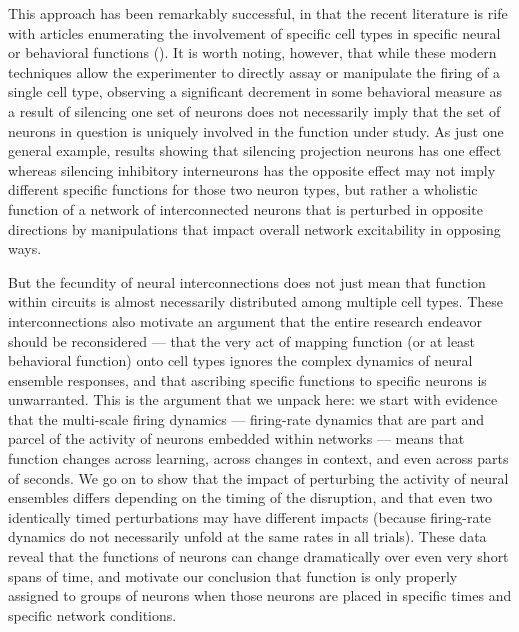 \begin{refsection}
This approach has been remarkably successful, in that the recent literature is rife with articles enumerating the involvement of specific cell types in specific neural or behavioral functions (\cite{adamantidis2015a,balthazart2020a,biselli2019a,janak2015a,tye2012a}). It is worth noting, however, that while these modern techniques allow the experimenter to directly assay or manipulate the firing of a single cell type, observing a significant decrement in some behavioral measure as a result of silencing one set of neurons does not necessarily imply that the set of neurons in question is uniquely involved in the function under study. As just one general example, results showing that silencing projection neurons has one effect whereas silencing inhibitory interneurons has the opposite effect may not imply different specific functions for those two neuron types, but rather a wholistic function of a network of interconnected neurons that is perturbed in opposite directions by manipulations that impact overall network excitability in opposing ways.

But the fecundity of neural interconnections does not just mean that function within circuits is almost necessarily distributed among multiple cell types. These interconnections also motivate an argument that the entire research endeavor should be reconsidered — that the very act of mapping function (or at least behavioral function) onto cell types ignores the complex dynamics of neural ensemble responses, and that ascribing specific functions to specific neurons is unwarranted. This is the argument that we unpack here: we start with evidence that the multi-scale firing dynamics — firing-rate dynamics that are part and parcel of the activity of neurons embedded within networks — means that function changes across learning, across changes in context, and even across parts of seconds. We go on to show that the impact of perturbing the activity of neural ensembles differs depending on the timing of the disruption, and that even two identically timed perturbations may have different impacts (because firing-rate dynamics do not necessarily unfold at the same rates in all trials). These data reveal that the functions of neurons can change dramatically over even very short spans of time, and motivate our conclusion that function is only properly assigned to groups of neurons when those neurons are placed in specific times and specific network conditions.


\end{refsection}
